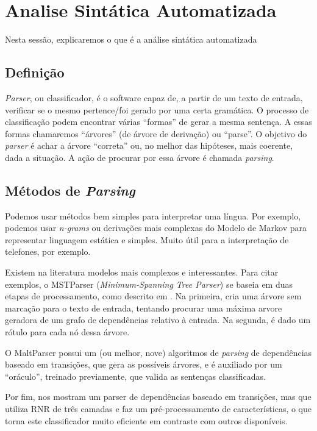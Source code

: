 \chapter{Analise Sintática Automatizada}
Nesta sessão, explicaremos o que é a análise sintática automatizada
\section{Definição}

\textit{Parser}, ou classificador, é o software capaz de, a partir de um texto de entrada, verificar se o mesmo pertence/foi gerado por uma certa gramática. O processo de classificação podem encontrar várias ``formas'' de gerar a mesma sentença. A essas formas chamaremos ``árvores'' (de árvore de derivação) ou ``parse''. O objetivo do \textit{parser} é achar a árvore ``correta'' ou, no melhor das hipóteses, mais coerente, dada a situação. A ação de procurar por essa árvore é chamada \textit{parsing}.

\section{Métodos de \textit{Parsing}}
Podemos usar métodos bem simples para interpretar uma língua. Por exemplo, podemos usar \textit{n-grams} ou derivações mais complexas do Modelo de Markov para representar linguagem estática e simples. Muito útil para a interpretação de telefones, por exemplo.

Existem na literatura modelos mais complexos e interessantes. Para citar exemplos, o MSTParser (\textit{Minimum-Spanning Tree Parser}) se baseia em duas etapas de processamento, como descrito em \cite{mstParser} . Na primeira, cria uma árvore sem marcação para o texto de entrada, tentando procurar uma máxima arvore geradora de um grafo de dependências relativo à entrada. Na segunda, é dado um rótulo para cada nó dessa árvore.

O MaltParser \cite{quickGuideMaltParser} possui um (ou melhor, nove) algoritmos de \textit{parsing} de dependências baseado em transições, que gera as possíveis árvores, e é auxiliado por um ``oráculo'', treinado previamente, que valida as sentenças classificadas.

Por fim, \citeauthor{fastAccurate} nos mostram um parser de dependências baseado em transições, mas que utiliza RNR de três camadas e faz um pré-processamento de características, o que torna este classificador muito eficiente em contraste com outros disponíveis.

